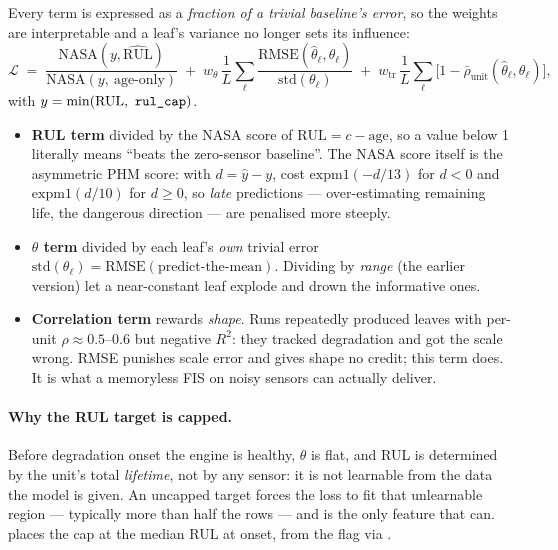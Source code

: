 \documentclass[11pt,a4paper]{article}
\newcommand{\code}[1]{\texttt{\detokenize{#1}}}
\begin{document}
Every term is expressed as a \emph{fraction of a trivial baseline's error}, so the
weights are interpretable and a leaf's variance no longer sets its influence:
\[
  \mathcal{L}
  \;=\;
  \frac{\mathrm{NASA}(y,\widehat{\mathrm{RUL}})}{\mathrm{NASA}(y,\ \text{age-only})}
  \;+\;
  w_{\theta}\,\frac{1}{L}\sum_{\ell}\frac{\mathrm{RMSE}(\hat\theta_\ell,\theta_\ell)}{\mathrm{std}(\theta_\ell)}
  \;+\;
  w_{\mathrm{tr}}\,\frac{1}{L}\sum_{\ell}\Big[1-\bar\rho_{\text{unit}}(\hat\theta_\ell,\theta_\ell)\Big],
\]
with $y=\min(\mathrm{RUL},\ \code{rul_cap})$.

\begin{itemize}[leftmargin=1.4em,itemsep=2pt]
\item \textbf{RUL term} divided by the NASA score of $\mathrm{RUL}=c-\mathrm{age}$, so
      a value below 1 literally means ``beats the zero-sensor baseline''. The NASA
      score itself is the asymmetric PHM score: with $d=\hat y-y$, cost
      $\mathrm{expm1}(-d/13)$ for $d<0$ and $\mathrm{expm1}(d/10)$ for $d\ge0$, so
      \emph{late} predictions --- over-estimating remaining life, the dangerous
      direction --- are penalised more steeply.
\item \textbf{$\theta$ term} divided by each leaf's \emph{own} trivial error
      $\mathrm{std}(\theta_\ell)=\mathrm{RMSE}(\text{predict-the-mean})$. Dividing by
      \emph{range} (the earlier version) let a near-constant leaf explode and drown
      the informative ones.
\item \textbf{Correlation term} rewards \emph{shape}. Runs repeatedly produced leaves
      with per-unit $\rho\approx0.5$--$0.6$ but negative $R^2$: they tracked
      degradation and got the scale wrong. RMSE punishes scale error and gives shape
      no credit; this term does. It is what a memoryless FIS on noisy sensors can
      actually deliver.
\end{itemize}

\paragraph{Why the RUL target is capped.} Before degradation onset the engine is
healthy, $\theta$ is flat, and RUL is determined by the unit's total \emph{lifetime},
not by any sensor: it is not learnable from the data the model is given. An uncapped
target forces the loss to fit that unlearnable region --- typically more than half the
rows --- and \code{age} is the only feature that can. \code{suggest_rul_cap} places
the cap at the median RUL at onset, from the \code{hs} flag via \code{since_onset}.
\end{document}
